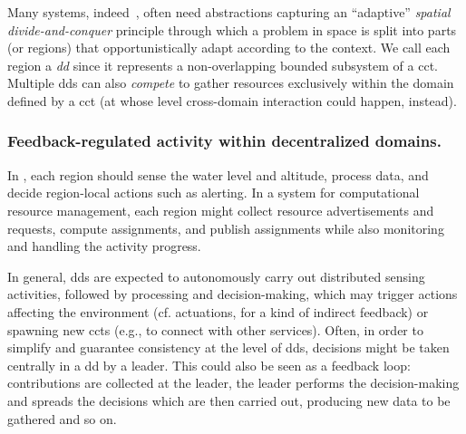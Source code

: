 Many systems, indeed~\cite{DBLP:journals/fgcs/PianiniCVN21},
often need abstractions capturing an ``adaptive''
\emph{spatial divide-and-conquer}
principle through which a problem in space
is split into parts (or regions)
that
opportunistically adapt according to the context.
We call each region a \emph{\ac{dd}} since it represents a non-overlapping bounded subsystem of a \ac{cct}.
%
Multiple \acp{dd} can also \emph{compete} to gather resources exclusively within the domain defined by a \ac{cct}
(at whose level cross-domain interaction could happen, instead).

\subsubsection{ Feedback-regulated activity within decentralized domains.}
%
In \casename{}, each region
 should sense the water level and altitude,
 process data,
 and decide region-local actions such as alerting.
%
In a system for computational resource management,
 each region
 might collect resource advertisements and requests,
 compute assignments,
 and publish assignments
 while also monitoring and handling the activity progress.

In general, \acp{dd} are expected to autonomously carry out distributed sensing activities,
 followed by processing and decision-making,
which may trigger actions 
 affecting the environment
 (cf. actuations, for a kind of indirect feedback)
 or spawning new \acp{cct} (e.g., to connect with other services).
%
Often, in order to simplify and guarantee consistency at the level of \acp{dd}, 
decisions might be taken centrally in a \ac{dd} 
 by a leader. 
This could also be seen as a feedback loop: contributions are collected at the leader,
 the leader performs the decision-making
 and spreads the decisions which are then carried out,
 producing new data to be gathered and so on.

